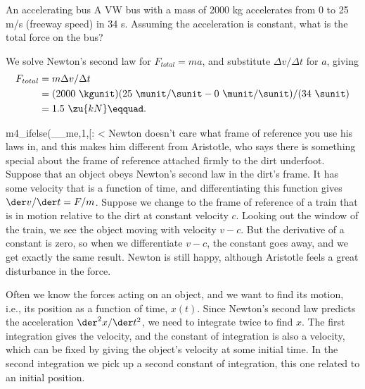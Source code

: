 \pagebreak

\begin{eg}{An accelerating bus}
\egquestion A VW bus with a mass of 2000 kg accelerates from 0
to 25 m/s (freeway speed) in 34 s. Assuming the acceleration
is constant, what is the total force on the bus?

\eganswer We solve Newton's second law for $F_{total}=ma$,
and substitute $\Delta v/\Delta t$ for $a$, giving
\begin{align*}
        F_{total} &=  m\Delta v/\Delta t  \\
             &=  (2000\ \kgunit)(25\ \munit/\sunit - 0\ \munit/\sunit)/(34\ \sunit)  \\
             &=  1.5\ \zu{kN}\eqquad.
\end{align*}
\end{eg}

m4_ifelse(__me,1,[:
<%
Newton doesn't care what frame of reference you use his laws in, and this makes
him different from Aristotle, who says there is something special about the
frame of reference attached firmly to the dirt underfoot. Suppose that an object
obeys Newton's second law in the dirt's frame. It has some velocity that is
a function of time, and differentiating this function gives $\der v/\der t=F/m$.
Suppose we change to the frame of reference of a train that is in motion relative to the
dirt at constant velocity $c$. Looking out the window of the train, we see the object
moving with velocity $v-c$. But the derivative of a constant is zero, so
when we differentiate $v-c$, the constant goes away, and we get exactly the same result.
Newton is still happy, although Aristotle feels a great disturbance in the force.

Often we know the forces acting on an object, and we want to find its motion, i.e., its
position as a function of time, $x(t)$. Since Newton's second law predicts the
acceleration $\der^2x/\der t^2$, we need to integrate twice to find $x$.
The first integration gives the velocity, and the constant of integration is also a velocity, which
can be fixed by giving the object's velocity at some initial time. In the second integration
we pick up a second constant of integration, this one related to an initial position.

